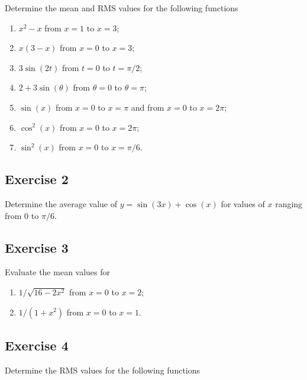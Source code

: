 \documentclass[
  english,
  11pt,
  oneside]{book}
\providecommand{\tightlist}{%
  \setlength{\itemsep}{0pt}\setlength{\parskip}{0pt}}
\newcommand{\slide}{}
\theoremstyle{definition}
\theoremstyle{definition}
\theoremstyle{definition}
\theoremstyle{definition}
\theoremstyle{remark}
\begin{document}
Determine the mean and RMS values for the following functions

\begin{enumerate}
\def\labelenumi{\roman{enumi}.}
\tightlist
\item
  \(x^2-x\) from \(x=1\) to \(x=3\);
\item
  \(x(3-x)\) from \(x=0\) to \(x=3\);
\item
  \(3\sin(2t)\) from \(t=0\) to \(t=\pi/2\);
\item
  \(2+3\sin(\theta)\) from \(\theta=0\) to \(\theta=\pi\);
\item
  \(\sin(x)\) from \(x=0\) to \(x=\pi\) and from \(x=0\) to \(x=2\pi\);
\item
  \(\cos^2(x)\) from \(x=0\) to \(x=2\pi\);
\item
  \(\sin^2(x)\) from \(x=0\) to \(x=\pi/6\).
\end{enumerate}

\slide

\subsection*{Exercise 2}\label{exercise-2-9}

Determine the average value of \(y = \sin(3x) + \cos(x)\) for values of \(x\) ranging from \(0\) to \(\pi/6\).

\slide

\subsection*{Exercise 3}\label{exercise-3-7}

Evaluate the mean values for

\begin{enumerate}
\def\labelenumi{\roman{enumi}.}
\tightlist
\item
  \(1/\sqrt{16-2x^2}\) from \(x=0\) to \(x=2\);
\item
  \(1/(1+x^2)\) from \(x=0\) to \(x=1\).
\end{enumerate}

\slide

\subsection*{Exercise 4}\label{exercise-4-5}

Determine the RMS values for the following functions
\end{document}
